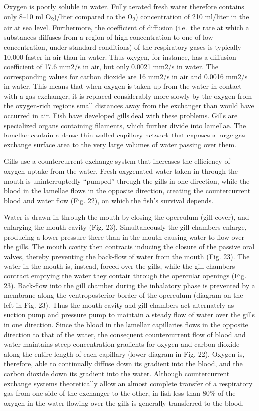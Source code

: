 Oxygen is poorly soluble in water. Fully aerated fresh water therefore contains only 8--10 ml O\textsubscript{2})/liter compared to the O\textsubscript{2}) concentration of 210 ml/liter in the air at sea level. Furthermore, the coefficient of diffusion (i.e.~the rate at which a substances diffuses from a region of high concentration to one of low concentration, under standard conditions) of the respiratory gases is typically 10,000 faster in air than in water. Thus oxygen, for instance, has a diffusion coefficient of 17.6 mm2/s in air, but only 0.0021 mm2/s in water. The corresponding values for carbon dioxide are 16 mm2/s in air and 0.0016 mm2/s in water. This means that when oxygen is taken up from the water in contact with a gas exchanger, it is replaced considerably more slowly by the oxygen from the oxygen-rich regions small distances away from the exchanger than would have occurred in air. Fish have developed gills deal with these problems. Gills are specialized organs containing filaments, which further divide into lamellae. The lamellae contain a dense thin walled capillary network that exposes a large gas exchange surface area to the very large volumes of water passing over them.

Gills use a countercurrent exchange system that increases the efficiency of oxygen-uptake from the water. Fresh oxygenated water taken in through the mouth is uninterruptedly ``pumped'' through the gills in one direction, while the blood in the lamellae flows in the opposite direction, creating the countercurrent blood and water flow (Fig. 22), on which the fish's survival depends.

Water is drawn in through the mouth by closing the operculum (gill cover), and enlarging the mouth cavity (Fig. 23). Simultaneously the gill chambers enlarge, producing a lower pressure there than in the mouth causing water to flow over the gills. The mouth cavity then contracts inducing the closure of the passive oral valves, thereby preventing the back-flow of water from the mouth (Fig. 23). The water in the mouth is, instead, forced over the gills, while the gill chambers contract emptying the water they contain through the opercular openings (Fig. 23). Back-flow into the gill chamber during the inhalatory phase is prevented by a membrane along the ventroposterior border of the operculum (diagram on the left in Fig. 23). Thus the mouth cavity and gill chambers act alternately as suction pump and pressure pump to maintain a steady flow of water over the gills in one direction. Since the blood in the lamellar capillaries flows in the opposite direction to that of the water, the consequent countercurrent flow of blood and water maintains steep concentration gradients for oxygen and carbon dioxide along the entire length of each capillary (lower diagram in Fig. 22). Oxygen is, therefore, able to continually diffuse down its gradient into the blood, and the carbon dioxide down its gradient into the water. Although countercurrent exchange systems theoretically allow an almost complete transfer of a respiratory gas from one side of the exchanger to the other, in fish less than 80\% of the oxygen in the water flowing over the gills is generally transferred to the blood.

